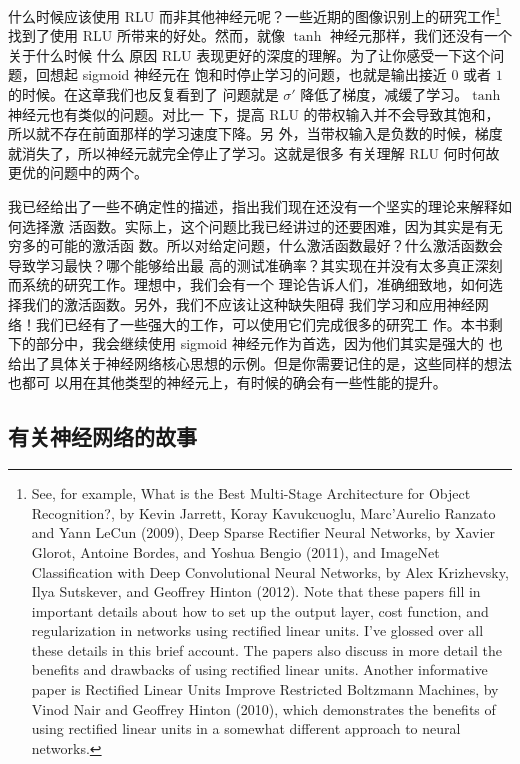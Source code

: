 什么时候应该使用 RLU 而非其他神经元呢？一些近期的图像识别上的研究工作\footnote{See, for example, What is the Best Multi-Stage Architecture for Object Recognition?, by Kevin Jarrett, Koray Kavukcuoglu, Marc'Aurelio Ranzato and Yann LeCun (2009), Deep Sparse Rectiﬁer Neural Networks, by Xavier Glorot, Antoine Bordes, and Yoshua Bengio (2011), and ImageNet Classification with Deep Convolutional Neural Networks, by Alex Krizhevsky, Ilya Sutskever, and Geoffrey Hinton (2012). Note that these papers fill in important details about how to set up the output layer, cost function, and regularization in networks using rectified linear units. I've glossed over all these details in this brief account. The papers also discuss in more detail the benefits and drawbacks of using rectified linear units. Another informative paper is Rectified Linear Units Improve Restricted Boltzmann Machines, by Vinod Nair and Geoffrey Hinton (2010), which demonstrates the benefits of using rectified linear units in a somewhat different approach to neural networks.}找到了使用
RLU 所带来的好处。然而，就像 $\tanh$ 神经元那样，我们还没有一个关于什么时候 什么
原因 RLU 表现更好的深度的理解。为了让你感受一下这个问题，回想起 sigmoid 神经元在
饱和时停止学习的问题，也就是输出接近 $0$ 或者 $1$ 的时候。在这章我们也反复看到了
问题就是 $\sigma'$ 降低了梯度，减缓了学习。$\tanh$ 神经元也有类似的问题。对比一
下，提高 RLU 的带权输入并不会导致其饱和，所以就不存在前面那样的学习速度下降。另
外，当带权输入是负数的时候，梯度就消失了，所以神经元就完全停止了学习。这就是很多
有关理解 RLU 何时何故更优的问题中的两个。

我已经给出了一些不确定性的描述，指出我们现在还没有一个坚实的理论来解释如何选择激
活函数。实际上，这个问题比我已经讲过的还要困难，因为其实是有无穷多的可能的激活函
数。所以对给定问题，什么激活函数最好？什么激活函数会导致学习最快？哪个能够给出最
高的测试准确率？其实现在并没有太多真正深刻而系统的研究工作。理想中，我们会有一个
理论告诉人们，准确细致地，如何选择我们的激活函数。另外，我们不应该让这种缺失阻碍
我们学习和应用神经网络！我们已经有了一些强大的工作，可以使用它们完成很多的研究工
作。本书剩下的部分中，我会继续使用 sigmoid 神经元作为首选，因为他们其实是强大的
也给出了具体关于神经网络核心思想的示例。但是你需要记住的是，这些同样的想法也都可
以用在其他类型的神经元上，有时候的确会有一些性能的提升。

\subsection{有关神经网络的故事}

